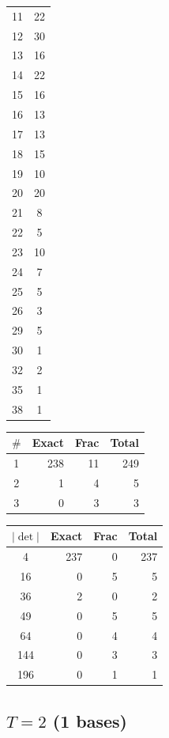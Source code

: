\documentclass[10pt]{article}
\begin{document}
\begin{center}
\begin{tabular}{c|c}
11 & 22 \\
12 & 30 \\
13 & 16 \\
14 & 22 \\
15 & 16 \\
16 & 13 \\
17 & 13 \\
18 & 15 \\
19 & 10 \\
20 & 20 \\
21 & 8 \\
22 & 5 \\
23 & 10 \\
24 & 7 \\
25 & 5 \\
26 & 3 \\
29 & 5 \\
30 & 1 \\
32 & 2 \\
35 & 1 \\
38 & 1 \\
\bottomrule
\end{tabular}
\end{center}

\begin{center}
\begin{tabular}{c|r r r}
\toprule
$\#$ & Exact & Frac & Total \\
\midrule
1 & 238 & 11 & 249 \\
2 & 1 & 4 & 5 \\
3 & 0 & 3 & 3 \\
\bottomrule
\end{tabular}
\qquad\qquad
\begin{tabular}{c|r r r}
\toprule
$|\det|$ & Exact & Frac & Total \\
\midrule
4 & 237 & 0 & 237 \\
16 & 0 & 5 & 5 \\
36 & 2 & 0 & 2 \\
49 & 0 & 5 & 5 \\
64 & 0 & 4 & 4 \\
144 & 0 & 3 & 3 \\
196 & 0 & 1 & 1 \\
\bottomrule
\end{tabular}
\end{center}

\newpage

\subsection*{$T = 2$ \quad (1 bases)}
\smallskip
\end{document}
